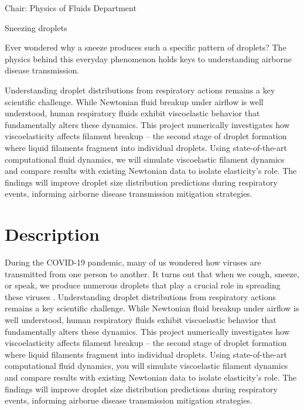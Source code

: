 \documentclass[a4paper,10pt]{article}
\begin{document}
\noindent Chair: Physics of Fluids Department

\begin{center}
	\begin{LARGE}
		Sneezing droplets
	\end{LARGE}
\end{center}

\noindent Ever wondered why a sneeze produces such a specific pattern of droplets? The physics behind this everyday phenomenon holds keys to understanding airborne disease transmission.

\begin{tcolorbox}[colback=mgray,colframe=mpurple,title=TL;DR]
	Understanding droplet distributions from respiratory actions remains a key scientific challenge. While Newtonian fluid breakup under airflow is well understood, human respiratory fluids exhibit viscoelastic behavior that fundamentally alters these dynamics. This project numerically investigates how viscoelasticity affects filament breakup -- the second stage of droplet formation where liquid filaments fragment into individual droplets. Using state-of-the-art computational fluid dynamics, we will simulate viscoelastic filament dynamics and compare results with existing Newtonian data to isolate elasticity's role. The findings will improve droplet size distribution predictions during respiratory events, informing airborne disease transmission mitigation strategies.
\end{tcolorbox}

\section*{Description}

During the COVID-19 pandemic, many of us wondered how viruses are transmitted from one person to another. It turns out that when we cough, sneeze, or speak, we produce numerous droplets that play a crucial role in spreading these viruses \citep{bourouiba2021fluid}. Understanding droplet distributions from respiratory actions remains a key scientific challenge. While Newtonian fluid breakup under airflow is well understood, human respiratory fluids exhibit viscoelastic behavior that fundamentally alters these dynamics. This project numerically investigates how viscoelasticity affects filament breakup -- the second stage of droplet formation where liquid filaments fragment into individual droplets. Using state-of-the-art computational fluid dynamics, you will simulate viscoelastic filament dynamics and compare results with existing Newtonian data to isolate elasticity's role. The findings will improve droplet size distribution predictions during respiratory events, informing airborne disease transmission mitigation strategies.
\end{document}
